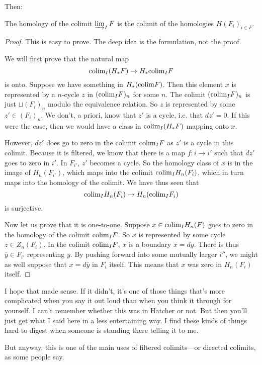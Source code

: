 Then: \begin{proposition} The homology of the colimit $\varinjlim_I F$ is the
colimit of the homologies $H(F_i)_{i \in F}$. \end{proposition}

\begin{proof} This is easy to prove. The deep idea is the formulation, not the
proof.

We will first prove that the natural map \[ \mathrm{colim}_I (H_*F) \to H_* \mathrm{colim}_I F
\] is onto. Suppose we have something in $H_*(\mathrm{colim} F)$. Then this element
$x$ is represented by a $n$-cycle $z$ in $(\mathrm{colim}_I F)_n$ for some $n$. The
colimit $(\mathrm{colim}_I F)_n$ is just $\sqcup (F_i)_n$ modulo the equivalence
relation. So $z$ is represented by some $z' \in (F_i)_n$. We don't, a priori,
know that $z'$ is a cycle, i.e. that $dz' = 0$. If this were the case, then we
would have a class in $\mathrm{colim}_I (H_* F)$ mapping onto $x$.

However, $dz'$ does go to zero in the colimit $\mathrm{colim}_I F$ as $z'$ is a cycle
in this colimit. Because it is filtered, we know that there is a map $f:i \to
i'$ such that $dz'$ goes to zero in $i'$. In $F_{i'}$, $z'$ becomes a cycle.
So the homology class of $x$ is in the image of $H_n(F_{i'})$, which maps into
the colimit $\mathrm{colim}_I H_n(F_i)$, which in turn maps into the homology of the
colimit. We have thus seen that \[ \mathrm{colim}_I H_n(F_i) \to H_n(\mathrm{colim}_I F_i) \]
is surjective.

Now let us prove that it is one-to-one. Suppose $x \in \mathrm{colim}_I H_n(F)$ goes
to zero in the homology of the colimit $\mathrm{colim}_I F$. So $x$ is represented by
some cycle $z \in Z_n(F_i)$. In the colimit $\mathrm{colim}_I F$, $x$ is a boundary $x
= dy$. There is thus $\overline{y} \in F_{i'}$ representing $y$. By pushing
forward into some mutually larger $i''$, we might as well suppose that $x = d
\overline{y}$ in $F_i$ itself. This means that $x$ was zero in $H_n(F_i)$
itself. \end{proof}

I hope that made sense. If it didn't, it's one of those things that's more
complicated when you say it out loud than when you think it through for
yourself. I can't remember whether this was in Hatcher or not. But then you'll
just get what I said here in a less entertaining way. I find these kinds of
things hard to digest when someone is standing there telling it to me.

But anyway, this is one of the main uses of filtered colimits---or directed
colimits, as some people say. 

